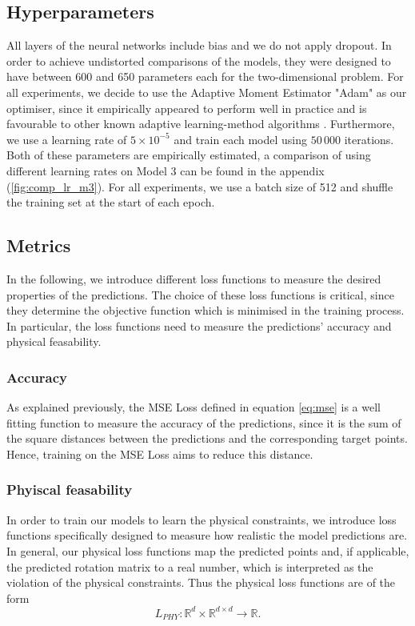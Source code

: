 \subsection{Hyperparameters}
All layers of the neural networks include bias and we do not apply dropout. In order to achieve undistorted comparisons of the models, they were designed to have between 600 and 650 parameters each for the two-dimensional problem. For all experiments, we decide to use the Adaptive Moment Estimator "Adam" as our optimiser, since it empirically appeared to perform well in practice and is favourable to other known adaptive learning-method algorithms \cite{DBLP:journals/corr/Ruder16}. Furthermore, we use a learning rate of $5\times 10^{-5}$ and train each model using $50\,000$ iterations. Both of these parameters are empirically estimated, a comparison of using different learning rates on Model 3 can be found in the appendix (\ref{fig:comp_lr_m3}). For all experiments, we use a batch size of 512 and shuffle the training set at the start of each epoch.

\subsection{Metrics}
In the following, we introduce different loss functions to measure the desired properties of the predictions. The choice of these loss functions is critical, since they determine the objective function which is minimised in the training process. In particular, the loss functions need to measure the predictions' accuracy and physical feasability.
\subsubsection{Accuracy}
As explained previously, the MSE Loss defined in equation \eqref{eq:mse} is a well fitting function to measure the accuracy of the predictions, since it is the sum of the square distances between the predictions and the corresponding target points. Hence, training on the MSE Loss aims to reduce this distance.
\subsubsection{Phyiscal feasability}
In order to train our models to learn the physical constraints, we introduce loss functions specifically designed to measure how realistic the model predictions are. In general, our physical loss functions map the predicted points and, if applicable, the predicted rotation matrix to a real number, which is interpreted as the violation of the physical constraints. Thus the physical loss functions are of the form
\[L_{PHY}: \mathbb{R}^d \times \mathbb{R}^{d \times d} \to \mathbb{R}. \]
